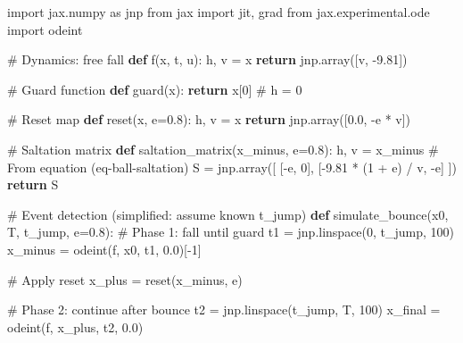 \documentclass[
  letterpaper,
  DIV=11,
  numbers=noendperiod]{scrartcl}
\newenvironment{Shaded}{\begin{snugshade}}{\end{snugshade}}
\newcommand{\CommentTok}[1]{\textcolor[rgb]{0.37,0.37,0.37}{#1}}
\newcommand{\ControlFlowTok}[1]{\textcolor[rgb]{0.00,0.23,0.31}{\textbf{#1}}}
\newcommand{\DecValTok}[1]{\textcolor[rgb]{0.68,0.00,0.00}{#1}}
\newcommand{\FloatTok}[1]{\textcolor[rgb]{0.68,0.00,0.00}{#1}}
\newcommand{\ImportTok}[1]{\textcolor[rgb]{0.00,0.46,0.62}{#1}}
\newcommand{\KeywordTok}[1]{\textcolor[rgb]{0.00,0.23,0.31}{\textbf{#1}}}
\newcommand{\NormalTok}[1]{\textcolor[rgb]{0.00,0.23,0.31}{#1}}
\newcommand{\OperatorTok}[1]{\textcolor[rgb]{0.37,0.37,0.37}{#1}}
\begin{document}
\begin{Shaded}
\begin{Highlighting}[]
\ImportTok{import}\NormalTok{ jax.numpy }\ImportTok{as}\NormalTok{ jnp}
\ImportTok{from}\NormalTok{ jax }\ImportTok{import}\NormalTok{ jit, grad}
\ImportTok{from}\NormalTok{ jax.experimental.ode }\ImportTok{import}\NormalTok{ odeint}

\CommentTok{\# Dynamics: free fall}
\KeywordTok{def}\NormalTok{ f(x, t, u):}
\NormalTok{    h, v }\OperatorTok{=}\NormalTok{ x}
    \ControlFlowTok{return}\NormalTok{ jnp.array([v, }\OperatorTok{{-}}\FloatTok{9.81}\NormalTok{])}

\CommentTok{\# Guard function}
\KeywordTok{def}\NormalTok{ guard(x):}
    \ControlFlowTok{return}\NormalTok{ x[}\DecValTok{0}\NormalTok{]  }\CommentTok{\# h = 0}

\CommentTok{\# Reset map}
\KeywordTok{def}\NormalTok{ reset(x, e}\OperatorTok{=}\FloatTok{0.8}\NormalTok{):}
\NormalTok{    h, v }\OperatorTok{=}\NormalTok{ x}
    \ControlFlowTok{return}\NormalTok{ jnp.array([}\FloatTok{0.0}\NormalTok{, }\OperatorTok{{-}}\NormalTok{e }\OperatorTok{*}\NormalTok{ v])}

\CommentTok{\# Saltation matrix}
\KeywordTok{def}\NormalTok{ saltation\_matrix(x\_minus, e}\OperatorTok{=}\FloatTok{0.8}\NormalTok{):}
\NormalTok{    h, v }\OperatorTok{=}\NormalTok{ x\_minus}
    \CommentTok{\# From equation (eq{-}ball{-}saltation)}
\NormalTok{    S }\OperatorTok{=}\NormalTok{ jnp.array([}
\NormalTok{        [}\OperatorTok{{-}}\NormalTok{e, }\DecValTok{0}\NormalTok{],}
\NormalTok{        [}\OperatorTok{{-}}\FloatTok{9.81} \OperatorTok{*}\NormalTok{ (}\DecValTok{1} \OperatorTok{+}\NormalTok{ e) }\OperatorTok{/}\NormalTok{ v, }\OperatorTok{{-}}\NormalTok{e]}
\NormalTok{    ])}
    \ControlFlowTok{return}\NormalTok{ S}

\CommentTok{\# Event detection (simplified: assume known t\_jump)}
\KeywordTok{def}\NormalTok{ simulate\_bounce(x0, T, t\_jump, e}\OperatorTok{=}\FloatTok{0.8}\NormalTok{):}
    \CommentTok{\# Phase 1: fall until guard}
\NormalTok{    t1 }\OperatorTok{=}\NormalTok{ jnp.linspace(}\DecValTok{0}\NormalTok{, t\_jump, }\DecValTok{100}\NormalTok{)}
\NormalTok{    x\_minus }\OperatorTok{=}\NormalTok{ odeint(f, x0, t1, }\FloatTok{0.0}\NormalTok{)[}\OperatorTok{{-}}\DecValTok{1}\NormalTok{]}

    \CommentTok{\# Apply reset}
\NormalTok{    x\_plus }\OperatorTok{=}\NormalTok{ reset(x\_minus, e)}

    \CommentTok{\# Phase 2: continue after bounce}
\NormalTok{    t2 }\OperatorTok{=}\NormalTok{ jnp.linspace(t\_jump, T, }\DecValTok{100}\NormalTok{)}
\NormalTok{    x\_final }\OperatorTok{=}\NormalTok{ odeint(f, x\_plus, t2, }\FloatTok{0.0}\NormalTok{)}


\end{Highlighting}
\end{Shaded}
\end{document}
